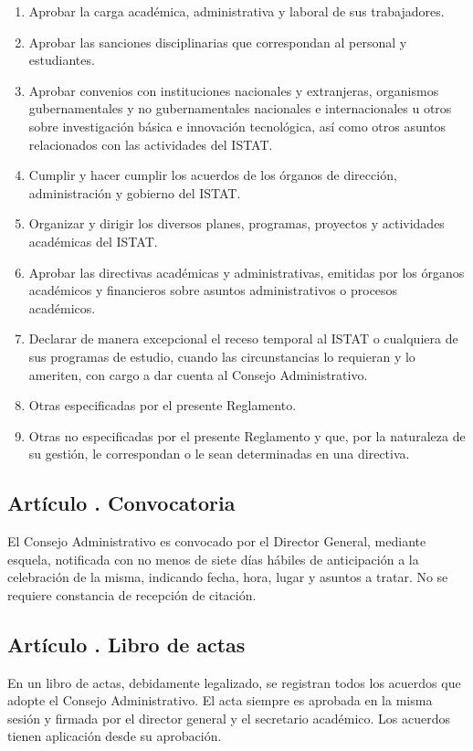 \begin{enumerate}
\item Aprobar la carga académica, administrativa y laboral de sus trabajadores. 
\item Aprobar las sanciones disciplinarias que correspondan al personal y estudiantes.  
\item Aprobar convenios con instituciones nacionales y extranjeras, organismos gubernamentales y no gubernamentales nacionales e internacionales u otros sobre investigación básica e innovación tecnológica, así como otros asuntos relacionados con las actividades del ISTAT. 
\item Cumplir y hacer cumplir los acuerdos de los órganos de dirección, administración y gobierno del ISTAT. 
\item Organizar y dirigir los diversos planes, programas, proyectos y actividades académicas del ISTAT. 
\item Aprobar las directivas académicas y administrativas, emitidas por los órganos académicos y financieros sobre asuntos administrativos o procesos académicos. 
\item Declarar de manera excepcional el receso temporal al ISTAT o cualquiera de sus programas de estudio, cuando las circunstancias lo requieran y lo ameriten, con cargo a dar cuenta al Consejo Administrativo. 
\item Otras especificadas por el presente Reglamento. 
\item Otras no especificadas por el presente Reglamento y que, por la naturaleza de su gestión, le correspondan o le sean determinadas en una directiva.  
\end{enumerate}
\subsection{Artículo . Convocatoria}
\addtocounter{ns}{1}
El Consejo Administrativo es convocado por el Director General, mediante esquela, notificada con no menos de siete días hábiles de anticipación a la celebración de la misma, indicando fecha, hora, lugar y asuntos a tratar. No se requiere constancia de recepción de citación.  
\subsection{Artículo . Libro de actas}
\addtocounter{ns}{1}
En un libro de actas, debidamente legalizado, se registran todos los acuerdos que adopte el Consejo Administrativo. El acta siempre es aprobada en la misma sesión y firmada por el director general y el secretario académico. Los acuerdos tienen aplicación desde su aprobación.
